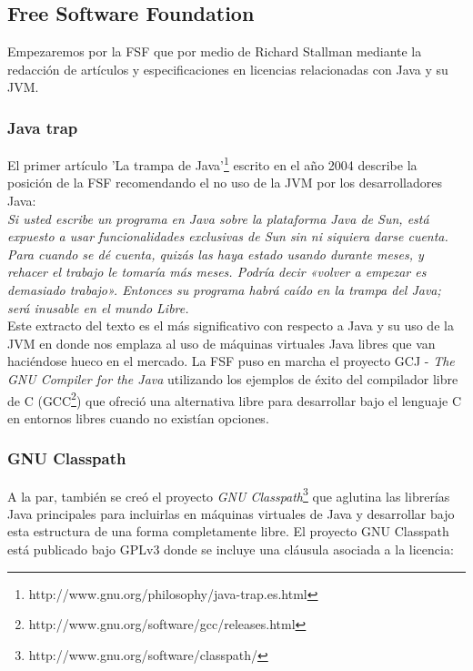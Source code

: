 \documentclass[11pt]{scrartcl}
\begin{document}
\subsection{Free Software Foundation}

Empezaremos por la FSF que por medio de Richard Stallman mediante la redacción de artículos y especificaciones en licencias relacionadas con Java y su JVM.

\subsubsection{Java trap}

El primer artículo 'La trampa de Java'\footnote{http://www.gnu.org/philosophy/java-trap.es.html} escrito en el año 2004 describe la posición de la FSF recomendando el no uso de la JVM por los desarrolladores Java:\\

    \emph{Si usted escribe un programa en Java sobre la plataforma Java de Sun, está expuesto a usar funcionalidades exclusivas de Sun sin ni siquiera darse cuenta. Para cuando se dé cuenta, quizás las haya estado usando durante meses, y rehacer el trabajo le tomaría más meses. Podría decir «volver a empezar es demasiado trabajo». Entonces su programa habrá caído en la trampa del Java; será inusable en el mundo Libre.}\\
    
Este extracto del texto es el más significativo con respecto a Java y su uso de la JVM en donde nos emplaza al uso de máquinas virtuales Java libres que van haciéndose hueco en el mercado.
La FSF puso en marcha el proyecto GCJ - \emph{The GNU Compiler for the Java} utilizando los ejemplos de éxito del compilador libre de C (GCC\footnote{http://www.gnu.org/software/gcc/releases.html}) que ofreció una alternativa libre para desarrollar bajo el lenguaje C en entornos libres cuando no existían opciones.

\subsubsection{GNU Classpath}

A la par, también se creó el proyecto \emph{GNU Classpath}\footnote{http://www.gnu.org/software/classpath/} que aglutina las librerías Java principales para incluirlas en máquinas virtuales de Java y desarrollar bajo esta estructura de una forma completamente libre.
El proyecto GNU Classpath está publicado bajo GPLv3 donde se incluye una cláusula asociada a la licencia:\\
\end{document}

